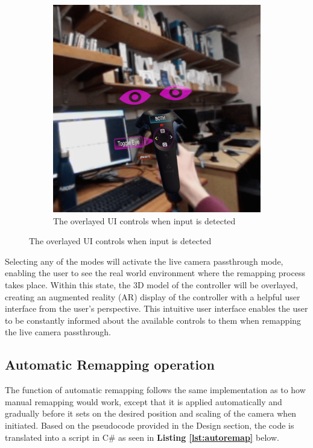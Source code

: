 \documentclass{l4proj}
\begin{document}
\begin{figure}[!h]
\begin{subfigure}[b]{0.4\textwidth}
        \includegraphics[width=\linewidth]{images/VRView_VFR-RemapMode_interacted_sq.png}
        \caption{The overlayed UI controls when input is detected}
        \label{fig:interactedController}
    \end{subfigure}
\end{figure}

Selecting any of the modes will activate the live camera passthrough mode, enabling the user to see the real world environment where the remapping process takes place. Within this state, the 3D model of the controller will be overlayed, creating an augmented reality (AR) display of the controller with a helpful user interface from the user's perspective. This intuitive user interface enables the user to be constantly informed about the available controls to them when remapping the live camera passthrough.

\subsection{Automatic Remapping operation}
The function of automatic remapping follows the same implementation as to how manual remapping would work, except that it is applied automatically and gradually before it sets on the desired position and scaling of the camera when initiated. Based on the pseudocode provided in the Design section, the code is translated into a script in C\# as seen in \textbf{Listing \ref{lst:autoremap}} below.
\end{document}
